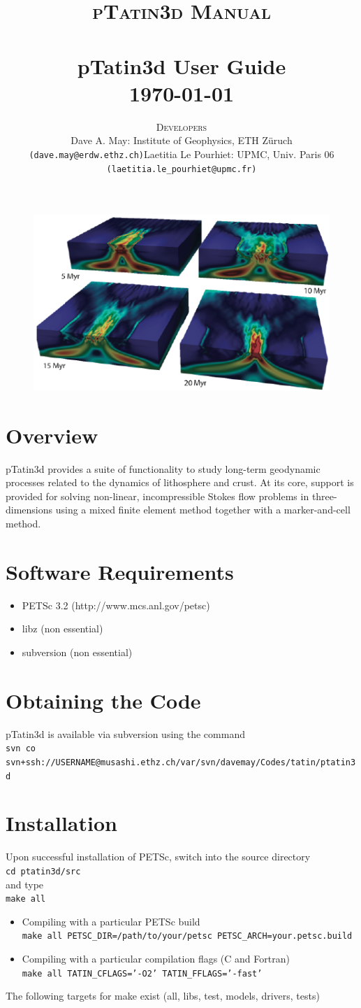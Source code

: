 \documentclass[paper=a4, fontsize=11pt,twoside]{scrartcl}
\title{	\normalsize \textsc{pTatin3d Manual} 	%
	\\[2.0cm]									%
	\HRule{2pt} \\ [0.3cm]						%
	\LARGE \textbf{{pTatin3d User Guide}}			%
	\HRule{2pt} \\ [0.5cm]						%
	\normalsize \today							%
	}
\author{
{\normalsize \textsc{Developers}}
\begin{itemize}
\item[-] Dave A. May: Institute of Geophysics, ETH Z{\"u}ruch \texttt{(dave.may@erdw.ethz.ch)} 
\item[-] Laetitia Le Pourhiet: UPMC, Univ. Paris 06  \texttt{(laetitia.le\_pourhiet@upmc.fr)}
\end{itemize}
}
\makeatletter
\newcommand{\ptat}{{pTatin3d}}
\newcommand{\shellcmd}[1]{\\\indent\indent\texttt{\hspace{5mm}\footnotesize #1}\\}
\def\printtitle{%
    {
    	\centering \@title\par}
		 	\vspace{10mm}
	\begin{figure} [hbtp]
	\includegraphics[height=0.4\textheight]{figs/ptat3d_front_page_small.pdf}
	\end{figure}
    }
\def\printauthor{%
    {\centering \large \@author}}
\makeatother
\begin{document}
\thispagestyle{empty}%

\printtitle%
  	\vfill
\printauthor%




\newpage
{}
\tableofcontents{}

\newpage


\section{Overview}
{\ptat} provides a suite of functionality to study long-term geodynamic processes related to the dynamics of lithosphere and crust.
At its core, support is provided for solving non-linear, incompressible Stokes flow problems in three-dimensions using a mixed finite element method together with a marker-and-cell method.




\newpage
\section{Software Requirements}
\begin{itemize}
	\item PETSc 3.2 (http://www.mcs.anl.gov/petsc)
	\item libz (non essential)
	\item subversion (non essential)
\end{itemize}

\section{Obtaining the Code}
{\ptat} is available via subversion using the command
\shellcmd{svn co svn+ssh://USERNAME@musashi.ethz.ch/var/svn/davemay/Codes/tatin/ptatin3d}

\section{Installation}
Upon successful installation of PETSc, switch into the source directory
\shellcmd{cd ptatin3d/src}
and type \shellcmd{make all}
\begin{itemize}
	\item Compiling with a particular PETSc build
	\shellcmd{make all PETSC\_DIR=/path/to/your/petsc PETSC\_ARCH=your.petsc.build}
	\item Compiling with a particular compilation flags (C and Fortran)
	\shellcmd{make all TATIN\_CFLAGS='-O2' TATIN\_FFLAGS='-fast'}
\end{itemize}
The following targets for make exist (all, libs, test, models, drivers, tests)
\end{document}
